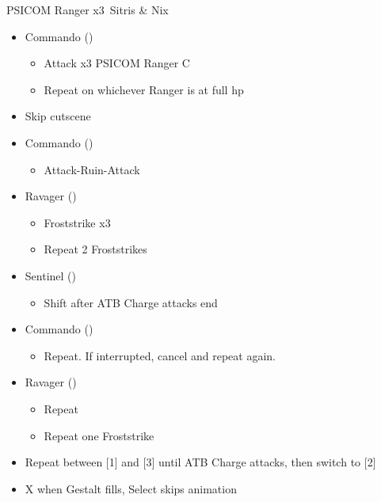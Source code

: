 
\renewcommand{\first}{[1] Commando (\com)}
\renewcommand{\second}{[2] Sentinel (\sen)}
\renewcommand{\third}{[3] Ravager (\rav)}

\begin{battle}{PSICOM Ranger x3\, Sitris \& Nix}
\begin{itemize}
    \item \first
    \begin{itemize}
        \item Attack x3 PSICOM Ranger C
        \item Repeat on whichever Ranger is at full hp
    \end{itemize}
    \item Skip cutscene
    \item \first
    \begin{itemize}
        \item Attack-Ruin-Attack
    \end{itemize}
    \item \third
    \begin{itemize}
        \item Froststrike x3
        \item Repeat 2 Froststrikes
    \end{itemize}
    \item \second
    \begin{itemize}
        \item Shift after ATB Charge attacks end
    \end{itemize}
    \item \first
    \begin{itemize}
        \item Repeat. If interrupted, cancel and repeat again.
    \end{itemize}
    \item \third
    \begin{itemize}
        \item Repeat
        \item Repeat one Froststrike
    \end{itemize}
    \item Repeat between [1] and [3] until ATB Charge attacks, then switch to [2]
    \item X when Gestalt fills, Select skips animation
\end{itemize}
 
\end{battle}